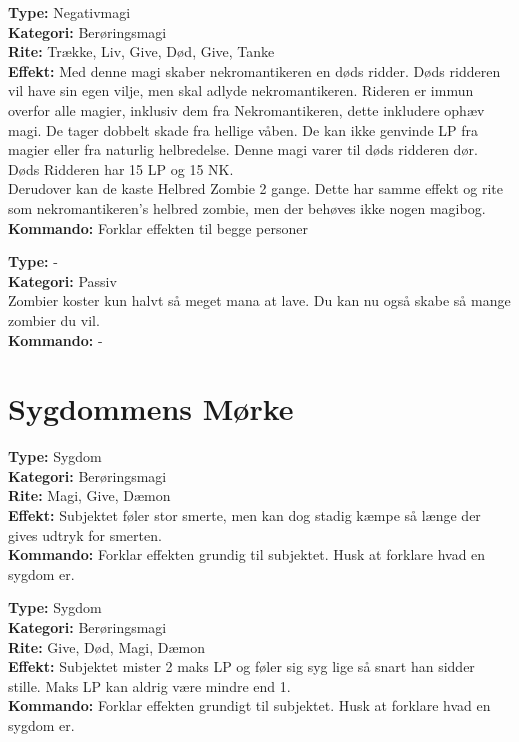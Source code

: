 \begin{zombie*}
\textbf{Type:} Negativmagi\\
\textbf{Kategori:} Berøringsmagi\\
\textbf{Rite:} Trække, Liv, Give, Død, Give, Tanke\\
\textbf{Effekt:} Med denne magi skaber nekromantikeren en døds ridder. Døds ridderen vil have sin egen vilje, men skal adlyde nekromantikeren. Rideren er immun overfor alle magier, inklusiv dem fra Nekromantikeren, dette inkludere ophæv magi. De tager dobbelt skade fra hellige våben. De kan ikke genvinde LP fra magier eller fra naturlig helbredelse. Denne magi varer til døds ridderen dør. Døds Ridderen har 15 LP og 15 NK.\\
Derudover kan de kaste Helbred Zombie 2 gange. Dette har samme effekt og rite som nekromantikeren's helbred zombie, men der behøves ikke nogen magibog.
\textbf{Kommando:} Forklar effekten til begge personer\\

\end{zombie*}

\begin{zombie*}
\textbf{Type:} - \\
\textbf{Kategori:} Passiv\\
Zombier koster kun halvt så meget mana at lave. Du kan nu også skabe så mange zombier du vil.\\
\textbf{Kommando:} -
\end{zombie*}

\section*{Sygdommens Mørke}

\begin{sygdom*}[Forrådnelse]
\textbf{Type:} Sygdom\\
\textbf{Kategori:} Berøringsmagi\\
\textbf{Rite:} Magi, Give, Dæmon\\
\textbf{Effekt:} Subjektet føler stor smerte, men kan dog stadig kæmpe så længe der gives udtryk for smerten.\\
\textbf{Kommando:} Forklar effekten grundig til subjektet. Husk at forklare hvad en sygdom er.
\end{sygdom*}

\begin{sygdom*}[Feber]
\textbf{Type:} Sygdom\\
\textbf{Kategori:} Berøringsmagi\\
\textbf{Rite:} Give, Død, Magi, Dæmon\\
\textbf{Effekt:} Subjektet mister 2 maks LP og føler sig syg lige så snart han sidder stille. Maks LP kan aldrig være mindre end 1.\\
\textbf{Kommando:} Forklar effekten grundigt til subjektet. Husk at forklare hvad en sygdom er.
\end{sygdom*}

